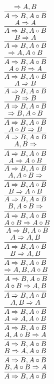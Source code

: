 \documentclass[11pt]{article}
\begin{document}
\begin{center}
\bigskip
\\$\infer{A\Rightarrow B, A\circ B}{\Rightarrow A, B}$
\bigskip
\\$\infer{A\Rightarrow B, A\circ B}{A\Rightarrow A}$
\bigskip
\\$\infer{A\Rightarrow B, A\circ B}{B\Rightarrow A}$
\bigskip
\\$\infer{A\Rightarrow B, A\circ B}{\Rightarrow A, A\circ B}$
\bigskip
\\$\infer{A\Rightarrow B, A\circ B}{A\circ B\Rightarrow A}$
\bigskip
\\$\infer{A\Rightarrow B, A\circ B}{A\Rightarrow B}$
\bigskip
\\$\infer{A\Rightarrow B, A\circ B}{B\Rightarrow B}$
\bigskip
\\$\infer{A\Rightarrow B, A\circ B}{\Rightarrow B, A\circ B}$
\bigskip
\\$\infer{A\Rightarrow B, A\circ B}{A\circ B\Rightarrow B}$
\bigskip
\\$\infer{A\Rightarrow B, A\circ B}{A, B\Rightarrow }$
\bigskip
\\$\infer{A\Rightarrow B, A\circ B}{A\Rightarrow A\circ B}$
\bigskip
\\$\infer{A\Rightarrow B, A\circ B}{A, A\circ B\Rightarrow }$
\bigskip
\\$\infer{A\Rightarrow B, A\circ B}{B\Rightarrow A\circ B}$
\bigskip
\\$\infer{A\Rightarrow B, A\circ B}{B, A\circ B\Rightarrow }$
\bigskip
\\$\infer{A\Rightarrow B, A\circ B}{A\circ B\Rightarrow A\circ B}$
\bigskip
\\$\infer{A\Rightarrow B, A\circ B}{A\Rightarrow A, B}$
\bigskip
\\$\infer{A\Rightarrow B, A\circ B}{B\Rightarrow A, B}$
\bigskip
\\$\infer{A\Rightarrow B, A\circ B}{\Rightarrow A, B, A\circ B}$
\bigskip
\\$\infer{A\Rightarrow B, A\circ B}{A\circ B\Rightarrow A, B}$
\bigskip
\\$\infer{A\Rightarrow B, A\circ B}{A, B\Rightarrow A}$
\bigskip
\\$\infer{A\Rightarrow B, A\circ B}{A\Rightarrow A, A\circ B}$
\bigskip
\\$\infer{A\Rightarrow B, A\circ B}{A, A\circ B\Rightarrow A}$
\bigskip
\\$\infer{A\Rightarrow B, A\circ B}{B\Rightarrow A, A\circ B}$
\bigskip
\\$\infer{A\Rightarrow B, A\circ B}{B, A\circ B\Rightarrow A}$

\end{center}
\end{document}
